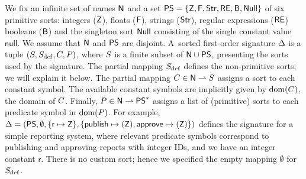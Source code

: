 We fix an infinite set of names $\mathsf{N}$ and a set $\mathsf{PS} =
	\{\mathsf{Z},\mathsf{F},\mathsf{Str},\mathsf{RE},\mathsf{B}, \mathsf{Null}\}$ of
six primitive sorts: integers ($\mathsf{Z}$), floats ($\mathsf{F}$), strings ($\mathsf{Str}$), regular expressions ($\mathsf{RE}$) booleans ($\mathsf{B}$) and the singleton sort $\mathsf{Null}$ consisting of the single constant value $\mathsf{null}$. We assume that $\mathsf{N}$ and $\mathsf{PS}$ are disjoint.
A~sorted first-order signature $\Delta$ is a tuple \((S, S_{\mathrm{def}}, C, P)\), %
where $S$ is a finite subset of $\mathsf{N} \cup \mathsf{PS}$, presenting the sorts used by the signature.
The partial mapping $S_{\mathrm{def}}$ defines the non-primitive sorts; we will explain it below.
The partial mapping $C \in \mathsf{N} \rightharpoonup S$ assigns a sort to each constant symbol.
The available constant symbols are implicitly given by $\operatorname{dom}(C)$, the domain of $C$.
Finally, $P \in \mathsf{N} \rightharpoonup \mathsf{PS}^*$ assigns a list of (primitive) sorts
to each predicate symbol in $\operatorname{dom}(P)$.
%
For example, $\Delta =
	(\mathsf{PS}, \emptyset, \{\mathsf{r} \mapsto \mathsf{Z}\}, \{\mathsf{publish} \mapsto (\mathsf{Z}),\mathsf{approve} \mapsto (\mathsf{Z})\})$ defines the
signature for a simple reporting system, where relevant predicate symbols correspond to publishing
and approving reports with integer IDs, and we have an integer constant $\mathsf{r}$.
There is no custom sort; hence we specified the empty mapping $\emptyset$ for $S_{\mathrm{def}}$.

